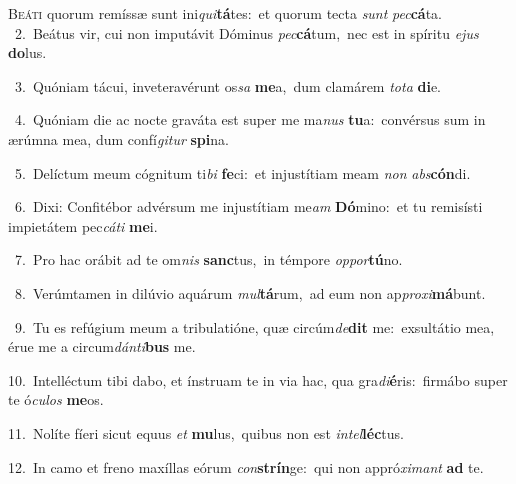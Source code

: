 \lettrine{\initial\textcolor{\initialcolor}{B}}{eáti} quorum remíssæ sunt ini\-\textit{qui}\-\textbf{tá}tes:~\star et quorum tecta \textit{sunt} \textit{pec}\-\textbf{cá}ta.\\
{\numbfont\textcolor{\numbcolor}{~2.}}~Beátus vir, cui non imputávit Dóminus \textit{pec}\-\textbf{cá}tum,~\star nec est in spíritu \textit{e}\-\textit{jus} \textbf{do}\-lus.\par
{\numbfont\textcolor{\numbcolor}{~3.}}~Quóniam tácui, inveteravérunt os\textit{sa} \textbf{me}\-a,~\star dum clamárem \textit{to}\-\textit{ta} \textbf{di}\-e.\par
{\numbfont\textcolor{\numbcolor}{~4.}}~Quóniam die ac nocte graváta est super me ma\textit{nus} \textbf{tu}\-a:~\star convérsus sum in ærúmna mea, dum confí\-\textit{gi}\-\textit{tur} \textbf{spi}\-na.\par
{\numbfont\textcolor{\numbcolor}{~5.}}~Delíctum meum cógnitum ti\textit{bi} \textbf{fe}\-ci:~\star et injustítiam meam \textit{non} \textit{abs}\-\textbf{cón}di.\par
{\numbfont\textcolor{\numbcolor}{~6.}}~Dixi: Confitébor advérsum me injustítiam me\textit{am} \textbf{Dó}\-mino:~\star et tu remisísti impietátem pec\-\textit{cá}\-\textit{ti} \textbf{me}\-i.\par
{\numbfont\textcolor{\numbcolor}{~7.}}~Pro hac orábit ad te om\textit{nis} \textbf{sanc}\-tus,~\star in témpore \textit{op}\-\textit{por}\textbf{tú}no.\par
{\numbfont\textcolor{\numbcolor}{~8.}}~Verúmtamen in dilúvio aquárum \textit{mul}\-\textbf{tá}rum,~\star ad eum non ap\-\textit{pro}\-\textit{xi}\textbf{má}bunt.\par
{\numbfont\textcolor{\numbcolor}{~9.}}~Tu es refúgium meum a tribulatióne, quæ circúm\-\textit{de}\-\textbf{dit} me:~\star exsultátio mea, érue me a circum\-\textit{dán}\-\textit{ti}\textbf{bus} me.\par
{\numbfont\textcolor{\numbcolor}{10.}}~Intelléctum tibi dabo, et ínstruam te in via hac, qua gra\-\textit{di}\-\textbf{é}ris:~\star firmábo super te ó\-\textit{cu}\-\textit{los} \textbf{me}\-os.\par
{\numbfont\textcolor{\numbcolor}{11.}}~Nolíte fíeri sicut equus \textit{et} \textbf{mu}\-lus,~\star quibus non est \textit{in}\-\textit{tel}\textbf{léc}tus.\par
{\numbfont\textcolor{\numbcolor}{12.}}~In camo et freno maxíllas eórum \textit{con}\-\textbf{strín}ge:~\star qui non appró\-\textit{xi}\-\textit{mant} \textbf{ad} te.\par
